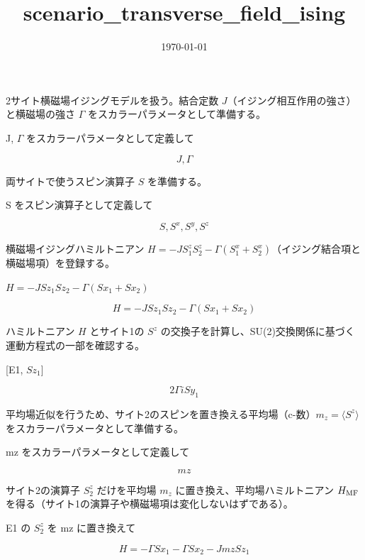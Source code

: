 \documentclass[dvipdfmx,a4paper,11pt]{jsarticle}
\title{scenario\_transverse\_field\_ising}
\date{\today}
\begin{document}
\maketitle

2サイト横磁場イジングモデルを扱う。結合定数 $J$（イジング相互作用の強さ）と横磁場の強さ $\Gamma$ をスカラーパラメータとして準備する。

J, $\Gamma$ をスカラーパラメータとして定義して

\[
  J, \Gamma
\]

両サイトで使うスピン演算子 $S$ を準備する。

S をスピン演算子として定義して

\[
  S, S^{x}, S^{y}, S^{z}
\]

横磁場イジングハミルトニアン $H=-JS^z_1S^z_2-\Gamma(S^x_1+S^x_2)$（イジング結合項と横磁場項）を登録する。

$H = -J Sz_1 Sz_2 - \Gamma (Sx_1 + Sx_2)$

\begin{equation}
  H = -J Sz_1 Sz_2 - \Gamma (Sx_1 + Sx_2)
  \label{eq:E1}
\end{equation}

ハミルトニアン $H$ とサイト1の $S^z$ の交換子を計算し、SU(2)交換関係に基づく運動方程式の一部を確認する。

[E1, $Sz_1$]

\begin{equation}
  2 \Gamma \mathit{i} Sy_1
  \label{eq:E2}
\end{equation}

平均場近似を行うため、サイト2のスピンを置き換える平均場（c-数）$m_z=\langle S^z\rangle$ をスカラーパラメータとして準備する。

mz をスカラーパラメータとして定義して

\[
  mz
\]

サイト2の演算子 $S^z_2$ だけを平均場 $m_z$ に置き換え、平均場ハミルトニアン $H_{\rm MF}$ を得る（サイト1の演算子や横磁場項は変化しないはずである）。

E1 の $S^z_2$ を mz に置き換えて

\begin{equation}
  H = - \Gamma Sx_1 - \Gamma Sx_2 - J mz Sz_1
  \label{eq:E3}
\end{equation}
\end{document}
